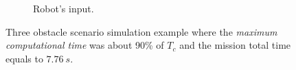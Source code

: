 \begin{figure}[!h]
\begin{subfigure}[b]{0.48\textwidth}
                \caption{Robot's input.}\label{fig:rinput}
        \end{subfigure}
        \caption{Three obstacle scenario simulation example where the \textit{maximum computational time} was about 90\% of $T_c$ and the mission total time equals to $7.76\ s$.}\label{fig:uni3}
\end{figure}

%
